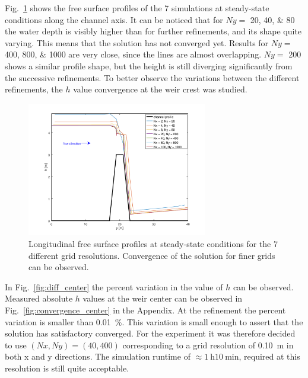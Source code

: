 Fig.~\ref{fig:water_profiles} shows the free surface profiles of the \num{7} simulations at steady-state conditions along the channel axis.
It can be noticed that for $Ny =$ \numlist{20;40;80} the water depth is visibly higher than for further refinements, and its shape quite varying.
This means that the solution has not converged yet.
Results for $Ny =$ \numlist{400;800;1000} are very close, since the lines are almost overlapping.
$Ny =$ \num{200} shows a similar profile shape, but the height is still diverging significantly from the successive refinements.
To better observe the variations between the different refinements, the $h$ value convergence at the weir crest was studied.

\begin{figure}[h]
  \centering
  \includegraphics[width=0.7\textwidth]{Figures/water_profiles.png}
  \caption{Longitudinal free surface profiles at steady-state conditions for the \num{7} different grid resolutions. Convergence of the solution for finer grids can be observed.}
  \label{fig:water_profiles}
\end{figure}

In Fig.~\ref{fig:diff_center} the percent variation in the value of $h$ can be observed.
Measured absolute $h$ values at the weir center can be observed in Fig.~\ref{fig:convergence_center} in the Appendix. 
At the  refinement the percent variation is smaller than \SI{0.01}{\percent}.
This variation is small enough to assert that the solution has satisfactory converged.
For the experiment it was therefore decided to use $(Nx, Ny) = (\num{40}, \num{400})$ corresponding to a grid resolution of \SI{0.10}{\m} in both x and y directions. The simulation runtime of $\approx \SI{1}{\hour} \SI{10}{\minute}$, required at this resolution is still quite acceptable.


